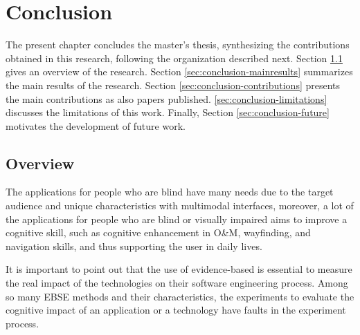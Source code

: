 \chapter{Conclusion}
\label{chap:conclusion}


The present chapter concludes the master's thesis, synthesizing the contributions obtained in this research, following the organization described next. Section \ref{sec:conclusion-summary} gives an overview of the research. Section \ref{sec:conclusion-mainresults} summarizes the main results of the research. Section \ref{sec:conclusion-contributions} presents the main contributions as also papers published. \ref{sec:conclusion-limitations} discusses the limitations of this work. Finally, Section \ref{sec:conclusion-future} motivates the development of future work.

\section{Overview}
\label{sec:conclusion-summary}

The applications for people who are blind have many needs due to the target audience and unique characteristics with multimodal interfaces, moreover, a lot of the applications for people who are blind or visually impaired aims to improve a cognitive skill, such as cognitive enhancement in O\&M, wayfinding, and navigation skills, and thus supporting the user in daily lives. 

It is important to point out that the use of evidence-based is essential to measure the real impact of the technologies on their software engineering process. Among so many \gls{EBSE} methods and their characteristics, the experiments to evaluate the cognitive impact of an application or a technology have faults in the experiment process.

